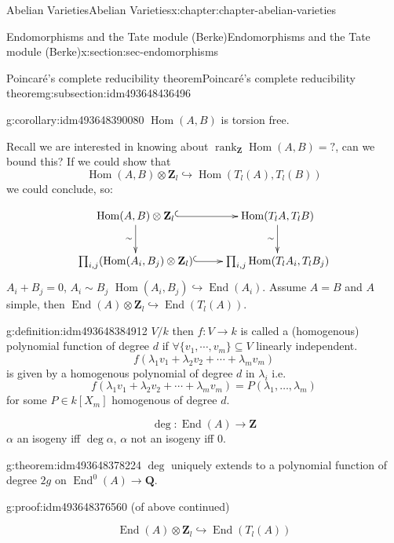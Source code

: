 \documentclass[oneside,10pt,]{book}
\numberwithin{equation}{section}
\newcommand{\lb}{[}
\newcommand{\rb}{]}
\newcommand{\ZZ}{\mathbf{Z}}
\newcommand{\QQ}{\mathbf{Q}}
\DeclareMathOperator{\End}{End}
\DeclareMathOperator{\Hom}{Hom}
\DeclareMathOperator{\rank}{rank}
\begin{document}
\begin{chapterptx}{Abelian Varieties}{}{Abelian Varieties}{}{}{x:chapter:chapter-abelian-varieties}
\begin{sectionptx}{Endomorphisms and the Tate module (Berke)}{}{Endomorphisms and the Tate module (Berke)}{}{}{x:section:sec-endomorphisms}
\begin{subsectionptx}{Poincaré's complete reducibility theorem}{}{Poincaré's complete reducibility theorem}{}{}{g:subsection:idm493648436496}
\begin{corollary}{}{}{g:corollary:idm493648390080}
\(\Hom(A,B)\) is torsion free.%
\end{corollary}
Recall we are interested in knowing about \(\rank_\ZZ\Hom(A,B) = ?\), can we bound this? If we could show that%
\begin{equation*}
\Hom(A,B) \otimes \ZZ_l \hookrightarrow \Hom(T_l(A),T_l(B))
\end{equation*}
we could conclude, so:%
\par
%
\begin{equation*}
\xymatrix{
\Hom(A,B)\otimes \ZZ_l \ar[d]_{\sim} \ar@{^(->}[r]     & \Hom(T_lA,T_lB)\ar[d]_{\sim} \\
\prod_{i,j} (\Hom(A_i, B_j) \otimes \ZZ_l) \ar@{^(->}[r] & \prod_{i,j}\Hom(T_lA_i, T_l B_j)
}
\end{equation*}
\(A_i + B_j = 0\), \(A_i\sim B_j\) \(\Hom(A_i, B_j) \hookrightarrow \End(A_i)\). Assume \(A= B\) and \(A\) simple, then \(\End(A) \otimes \ZZ_l \hookrightarrow \End(T_l(A))\).%
\begin{definition}{}{g:definition:idm493648384912}%
\(V/k\) then \(f\colon V \to k\) is called a (homogenous) polynomial function of degree \(d\) if \(\forall \{v_1,\cdots, v_m\}\subseteq V\) linearly independent.%
\begin{equation*}
f(\lambda_1 v_1 + \lambda_2 v_2 +\cdots + \lambda_m v_m)
\end{equation*}
is given by a homogenous polynomial of degree \(d\) in \(\lambda_i\) i.e.%
\begin{equation*}
f(\lambda_1 v_1 + \lambda_2 v_2 +\cdots + \lambda_m v_m) = P(\lambda_1,\ldots, \lambda_m)
\end{equation*}
for some \(P\in k\lb X_m\rb\) homogenous of degree \(d\).%
\end{definition}
%
\begin{equation*}
\deg\colon \End(A) \to \ZZ
\end{equation*}
\(\alpha\) an isogeny iff \(\deg \alpha\), \(\alpha\) not an isogeny iff \(0\).%
\begin{theorem}{}{}{g:theorem:idm493648378224}%
\(\deg\) uniquely extends to a polynomial function of degree \(2g\) on \(\End^0(A) \to \QQ\).%
\end{theorem}
\begin{proofptx}{}{g:proof:idm493648376560}
(of above continued)%
\par
%
\begin{equation*}
\End(A) \otimes \ZZ_l \hookrightarrow\End(T_l(A))
\end{equation*}

\end{proofptx}
\end{subsectionptx}
\end{sectionptx}
\end{chapterptx}
\end{document}

